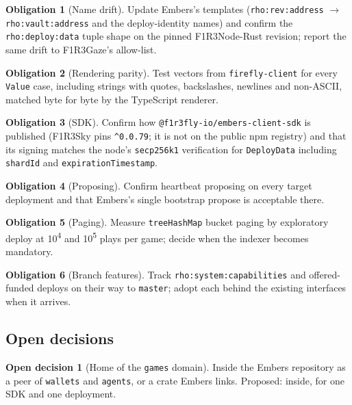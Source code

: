 \documentclass[11pt]{article}
\theoremstyle{definition}
\newtheorem{decision}{Open decision}
\newtheorem{obligation}{Obligation}
\theoremstyle{remark}
\newcommand{\code}[1]{\texttt{#1}}
\newcommand{\Nd}{F1R3Node-Rust}
\newcommand{\Em}{Embers}
\newcommand{\Sky}{F1R3Sky}
\newcommand{\Gz}{F1R3Gaze}
\begin{document}
\begin{obligation}[Name drift]\label{ob:drift}
Update \Em{}'s templates (\code{rho:rev:address} $\to$ \code{rho:vault:address} and
the deploy-identity names) and confirm the \code{rho:deploy:data} tuple shape on the
pinned \Nd{} revision; report the same drift to \Gz{}'s allow-list.
\end{obligation}

\begin{obligation}[Rendering parity]\label{ob:render}
Test vectors from \code{firefly-client} for every \code{Value} case, including
strings with quotes, backslashes, newlines and non-ASCII, matched byte for byte by
the TypeScript renderer.
\end{obligation}

\begin{obligation}[SDK]\label{ob:sdk}
Confirm how \code{@f1r3fly-io/embers-client-sdk} is published (\Sky{} pins
\code{\^{}0.0.79}; it is not on the public npm registry) and that its signing matches
the node's \code{secp256k1} verification for \code{DeployData} including
\code{shardId} and \code{expirationTimestamp}.
\end{obligation}

\begin{obligation}[Proposing]
Confirm heartbeat proposing on every target deployment and that \Em{}'s single
bootstrap propose is acceptable there.
\end{obligation}

\begin{obligation}[Paging]\label{ob:paging}
Measure \code{treeHashMap} bucket paging by exploratory deploy at 10\textsuperscript{4}
and 10\textsuperscript{5} plays per game; decide when the indexer becomes mandatory.
\end{obligation}

\begin{obligation}[Branch features]
Track \code{rho:system:capabilities} and offered-funded deploys on their way to
\code{master}; adopt each behind the existing interfaces when it arrives.
\end{obligation}

\subsection{Open decisions}

\begin{decision}[Home of the \code{games} domain]\label{dec:home}
Inside the \Em{} repository as a peer of \code{wallets} and \code{agents}, or a crate
\Em{} links. Proposed: inside, for one SDK and one deployment.
\end{decision}
\end{document}
